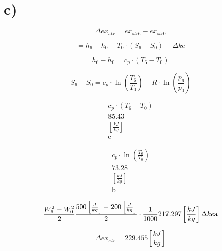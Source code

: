 

\section*{c)}

\[
\Delta ex_{str} = ex_{str6} - ex_{str0}
\]

\[
= h_6 - h_0 - T_0 \cdot (S_6 - S_0) + \Delta ke
\]

\[
h_6 - h_0 = c_p \cdot (T_6 - T_0)
\]

\[
S_6 - S_0 = c_p \cdot \ln \left( \frac{T_6}{T_0} \right) - R \cdot \ln \left( \frac{p_6}{p_0} \right)
\]

\[
\begin{array}{c}
c_p \cdot (T_6 - T_0) \\
85.43 \\
\left[ \frac{kJ}{kg} \right] \\
\text{c}
\end{array}
\]

\[
\begin{array}{c}
c_p \cdot \ln \left( \frac{T_6}{T_0} \right) \\
73.28 \\
\left[ \frac{kJ}{kg} \right] \\
\text{b}
\end{array}
\]

\[
\frac{W_6^2 - W_0^2}{2} \\
\frac{500 \left[ \frac{J}{kg} \right] - 200 \left[ \frac{J}{kg} \right]}{2} \cdot \frac{1}{1000} \\
217.297 \left[ \frac{kJ}{kg} \right] \\
\Delta ke \\
\text{a}
\]

\[
\boxed{\Delta ex_{str} = 229.455 \left[ \frac{kJ}{kg} \right]}
\]